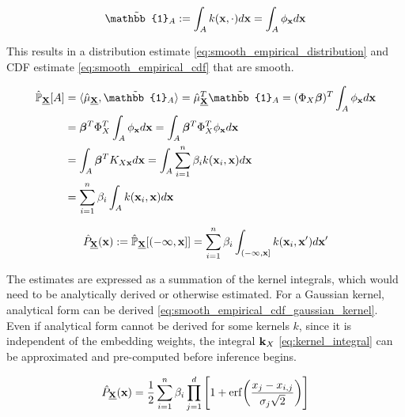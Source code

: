 \documentclass[twoside]{article} \usepackage{aistats2017}
\theoremstyle{definition}
\theoremstyle{remark}
\newcommand{\rv}[1]{\underline{#1}}
\newcommand{\ds}[1]{{#1}}
\begin{document}
		\begin{equation}
			\tilde{\mathbb{1}}_{A} := \int_{A} k(\bvec{x}, \cdot) d\bvec{x} = \int_{A} \phi_{\bvec{x}} d\bvec{x}
		\label{eq:indicator_smooth}
		\end{equation}
		
		This results in a distribution estimate \eqref{eq:smooth_empirical_distribution} and CDF estimate \eqref{eq:smooth_empirical_cdf} that are smooth.

		\begin{equation}
		\begin{aligned}
			\hat{\mathbb{P}}_{\bvec{\rv{X}}}[A] &= \langle \hat{\mu}_{\bvec{\rv{X}}}, \tilde{\mathbb{1}}_{A} \rangle = \hat{\mu}_{\bvec{\rv{X}}}^{T} \tilde{\mathbb{1}}_{A} = (\Phi_{\ds{X}} \bm{\beta})^{T} \int_{A} \phi_{\bvec{x}} d\bvec{x} \\
			&= \bm{\beta}^{T} \Phi_{\ds{X}}^{T} \int_{A} \phi_{\bvec{x}} d\bvec{x} = \int_{A} \bm{\beta}^{T} \Phi_{\ds{X}}^{T} \phi_{\bvec{x}} d\bvec{x} \\
			&= \int_{A} \bm{\beta}^{T} K_{\ds{X} \bvec{x}} d\bvec{x} = \int_{A} \sum_{i = 1}^{n} \beta_{i} k(\bvec{x}_{i}, \bvec{x}) d\bvec{x} \\
			&= \sum_{i = 1}^{n} \beta_{i} \int_{A}  k(\bvec{x}_{i}, \bvec{x}) d\bvec{x} \\
		\end{aligned}
		\label{eq:smooth_empirical_distribution}
		\end{equation}	
		
		\begin{equation}
			\hat{P}_{\bvec{\rv{X}}}(\bvec{x}) := \hat{\mathbb{P}}_{\bvec{\rv{X}}}[(-\bvec{\infty}, \bvec{x}]] = \sum_{i = 1}^{n} \beta_{i} \int_{(-\bvec{\infty}, \bvec{x}]}  k(\bvec{x}_{i}, \bvec{x}') d\bvec{x}'
		\label{eq:smooth_empirical_cdf}
		\end{equation}
		
		The estimates are expressed as a summation of the kernel integrals, which would need to be analytically derived or otherwise estimated. For a Gaussian kernel, analytical form can be derived \eqref{eq:smooth_empirical_cdf_gaussian_kernel}. Even if analytical form cannot be derived for some kernels $k$, since it is independent of the embedding weights, the integral $\bvec{k}_{\ds{X}}$ \eqref{eq:kernel_integral} can be approximated and pre-computed before inference begins.

		\begin{equation}
			\hat{P}_{\bvec{\rv{X}}}(\bvec{x}) = \frac{1}{2} \sum_{i = 1}^{n} \beta_{i} \prod_{j = 1}^{d} \Bigg[1 + \mathrm{erf}\bigg(\frac{x_{j} - x_{i, j}}{\sigma_{j} \sqrt{2}}\bigg)\Bigg]
		\label{eq:smooth_empirical_cdf_gaussian_kernel}
		\end{equation}
\end{document}
